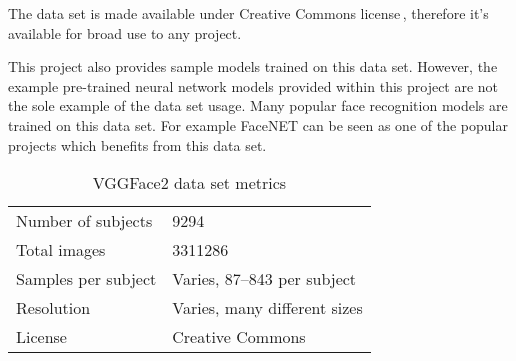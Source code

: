 The data set is made available under Creative Commons license\,\cite{cc_by-sa_40}, therefore it's available for broad use to any project.

This project also provides sample models trained on this data set. However, the example pre-trained neural network models provided within this project are not the sole example of the data set usage. Many popular face recognition models are trained on this data set. For example FaceNET can be seen as one of the popular projects which benefits from this data set.

\begin{table}[ht]
    \centering
    \caption{VGGFace2 data set metrics}

    \begin{tabularx}{0.75\textwidth}{l|l}
        \toprule
        Number of subjects & \num{9294} \\
        Total images & \num{3311286} \\
        Samples per subject & Varies, 87--843 per subject \\
        Resolution & Varies, many different sizes \\
        License & Creative Commons\,\cite{cc_by-sa_40} \\
        \bottomrule
    \end{tabularx}
\end{table}
